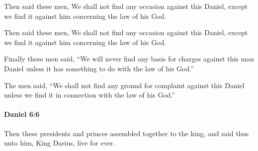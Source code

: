 			Then said these men, We shall not find any occasion against this Daniel, except we find it against him concerning the law of his God.

			\begin{versebox}
					\item[BHS] 
					\item[LXX] 
					\item[ASV] Then said these men, We shall not find any occasion against this Daniel, except we find it against him concerning the law of his God.
					\item[NIV] Finally these men said, “We will never find any basis for charges against this man Daniel unless it has something to do with the law of his God.”
					\item[NRSV] The men said, “We shall not find any ground for complaint against this Daniel unless we find it in connection with the law of his God.”
			\end{versebox}

		\paragraph{Daniel 6:6} %
			\label{DANIEL-6-6}

			Then these presidents and princes assembled together to the king, and said thus unto him, King Darius, live for ever.

